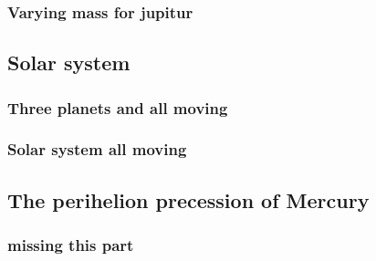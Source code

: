 \subsubsection{Varying mass for jupitur}




\subsection{Solar system}


\subsubsection{Three planets and all moving}


\subsubsection{Solar system all moving}





\subsection{The perihelion precession of Mercury}

\subsubsection{missing this part}